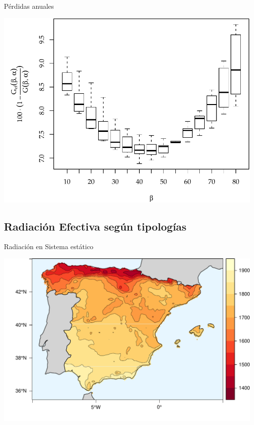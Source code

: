 \documentclass[xcolor={usenames,svgnames,dvipsnames}]{beamer}
\begin{document}
\begin{frame}[label={sec:orgfffaa37}]{Pérdidas anuales}
\begin{center}
\includegraphics[width=.9\linewidth]{../figs/GefVSG.pdf}
\end{center}
\end{frame}

\subsection{Radiación Efectiva según tipologías}
\label{sec:org98fb00b}

\begin{frame}[label={sec:orgdd5b35e}]{Radiación en Sistema estático}
\begin{center}
\includegraphics[width=.9\linewidth]{../figs/FixedKrig.pdf}
\end{center}
\end{frame}
\end{document}
